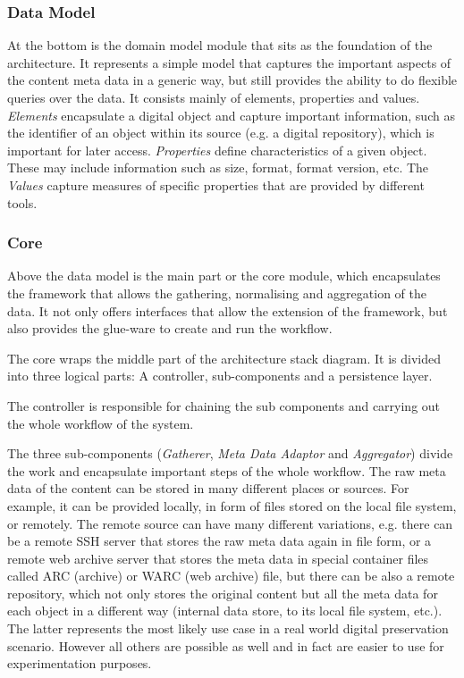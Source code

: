\subsubsection{Data Model}

At the bottom is the domain model module that sits as the foundation of the architecture. It represents a simple model that captures the important aspects of the content meta data in a generic way, but still provides the ability to do flexible queries over the data. It consists mainly of elements, properties and values. \textit{Elements} encapsulate a digital object and capture important information, such as the identifier of an object within its source (e.g. a digital repository), which is important for later access. \textit{Properties} define characteristics of a given object. These may include information such as size, format, format version, etc. The \textit{Values} capture measures of specific properties that are provided by different tools.

\subsubsection{Core}
Above the data model is the main part or the core module, which encapsulates the framework that allows the gathering, normalising and aggregation of the data. It not only offers interfaces that allow the extension of the framework, but also provides the glue-ware to create and run the workflow.

The core wraps the middle part of the architecture stack diagram. It is divided into three logical parts: A controller, sub-components and a persistence layer.

The controller is responsible for chaining the sub components and carrying out the whole workflow of the system.

The three sub-components (\textit{Gatherer}, \textit{Meta Data Adaptor} and \textit{Aggregator}) divide the work and encapsulate important steps of the whole workflow. The raw meta data of the content can be stored in many different places or sources. For example, it can be provided locally, in form of files stored on the local file system, or remotely. The remote source can have many different variations, e.g. there can be a remote SSH server that stores the raw meta data again in file form, or a remote web archive server that stores the meta data in special container files called ARC (archive) or WARC (web archive) file, but there can be also a remote repository, which not only stores the original content but all the meta data for each object in a different way (internal data store, to its local file system, etc.). The latter represents the most likely use case in a real world digital preservation scenario. However all others are possible as well and in fact are easier to use for experimentation purposes.

